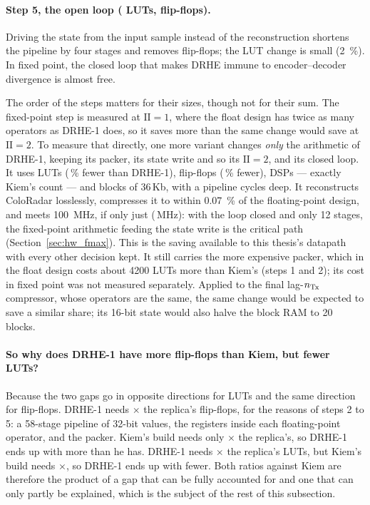 \paragraph{Step 5, the open loop (  LUTs,
  flip-flops).} Driving the state from the
input sample instead of the reconstruction shortens the pipeline by four
stages and removes  flip-flops; the LUT change is small
(\SI{2}{\percent}). In fixed point, the closed loop that makes DRHE immune to
encoder--decoder divergence is almost free.

\noindent
The order of the steps matters for their sizes, though not for their sum. The
fixed-point step is measured at $\mathrm{II} = 1$, where the float design has
twice as many operators as DRHE-1 does, so it saves more than the same change
would save at $\mathrm{II} = 2$. To measure that directly, one more variant
changes \emph{only} the arithmetic of DRHE-1, keeping its packer, its state
write and so its $\mathrm{II} = 2$, and its closed loop. It uses
 LUTs (\,\% fewer than DRHE-1),
 flip-flops (\,\% fewer),  DSPs
--- exactly Kiem's count --- and  blocks of 36\,Kb, with a pipeline
 cycles deep. It reconstructs ColoRadar losslessly, compresses
it to within \SI{0.07}{\percent} of the floating-point design, and meets
\SI{100}{\mega\hertz}, if only just (\,MHz): with the loop
closed and only 12 stages, the fixed-point arithmetic feeding the state write
is the critical path (Section~\ref{sec:hw_fmax}). This is the saving available
to this thesis's datapath with every other decision kept. It still carries the
more expensive packer, which in the float design costs about \num{4200} LUTs
more than Kiem's (steps 1 and 2); its cost in fixed point was not measured
separately. Applied to the final lag-$n_{\mathrm{Tx}}$ compressor, whose operators are the
same, the same change would be expected to save a similar share; its 16-bit
state would also halve the block RAM to 20 blocks.

\paragraph{So why does DRHE-1 have more flip-flops than Kiem, but fewer LUTs?}
Because the two gaps go in opposite directions for LUTs and the same direction
for flip-flops. DRHE-1 needs $\times$ the replica's
flip-flops, for the reasons of steps 2 to 5: a 58-stage pipeline of 32-bit
values, the registers inside each floating-point operator, and the packer.
Kiem's build needs only $\times$ the replica's, so DRHE-1
ends up with more than he has. DRHE-1 needs $\times$ the
replica's LUTs, but Kiem's build needs $\times$, so DRHE-1
ends up with fewer. Both ratios against Kiem are therefore the product of a gap
that can be fully accounted for and one that can only partly be explained,
which is the subject of the rest of this subsection.

